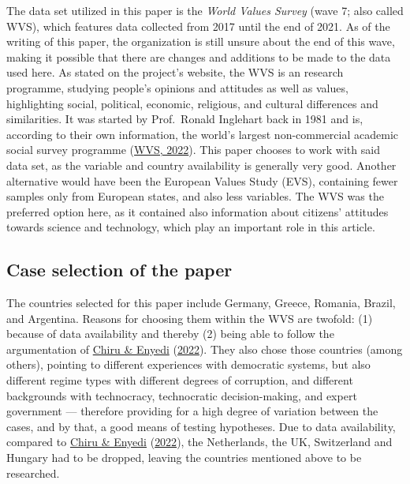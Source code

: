\documentclass[
  12pt,
  english,
]{article}
\begin{document}
The data set utilized in this paper is the \emph{World Values Survey}
(wave 7; also called WVS), which features data collected from 2017 until
the end of 2021. As of the writing of this paper, the organization is
still unsure about the end of this wave, making it possible that there
are changes and additions to be made to the data used here. As stated on
the project's website, the WVS is an research programme, studying
people's opinions and attitudes as well as values, highlighting social,
political, economic, religious, and cultural differences and
similarities. It was started by Prof.~Ronald Inglehart back in 1981 and
is, according to their own information, the world's largest
non-commercial academic social survey programme
(\protect\hyperlink{ref-wvs2022info}{WVS, 2022}). This paper chooses to
work with said data set, as the variable and country availability is
generally very good. Another alternative would have been the European
Values Study (EVS), containing fewer samples only from European states,
and also less variables. The WVS was the preferred option here, as it
contained also information about citizens' attitudes towards science and
technology, which play an important role in this article.

\hypertarget{case-selection-of-the-paper}{%
\subsection{Case selection of the
paper}\label{case-selection-of-the-paper}}

The countries selected for this paper include Germany, Greece, Romania,
Brazil, and Argentina. Reasons for choosing them within the WVS are
twofold: (1) because of data availability and thereby (2) being able to
follow the argumentation of \protect\hyperlink{ref-chiru2022wants}{Chiru
\& Enyedi} (\protect\hyperlink{ref-chiru2022wants}{2022}). They also
chose those countries (among others), pointing to different experiences
with democratic systems, but also different regime types with different
degrees of corruption, and different backgrounds with technocracy,
technocratic decision-making, and expert government --- therefore
providing for a high degree of variation between the cases, and by that,
a good means of testing hypotheses. Due to data availability, compared
to \protect\hyperlink{ref-chiru2022wants}{Chiru \& Enyedi}
(\protect\hyperlink{ref-chiru2022wants}{2022}), the Netherlands, the UK,
Switzerland and Hungary had to be dropped, leaving the countries
mentioned above to be researched.
\end{document}

